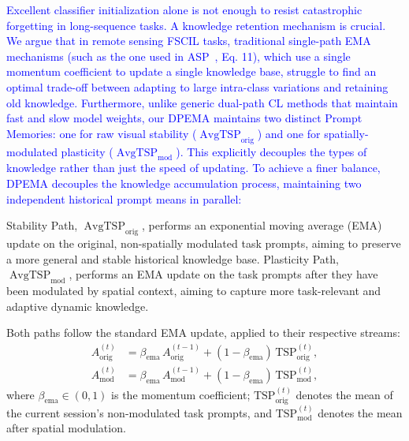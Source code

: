 ﻿\documentclass[letterpaper,journal]{IEEEtran}
\begin{document}
\textcolor{blue}{Excellent classifier initialization alone is not enough to resist catastrophic forgetting in long-sequence tasks. A knowledge retention mechanism is crucial. We argue that in remote sensing FSCIL tasks, traditional single-path EMA mechanisms (such as the one used in ASP~\cite{liu2024}, Eq. 11), which use a single momentum coefficient to update a single knowledge base, struggle to find an optimal trade-off between adapting to large intra-class variations and retaining old knowledge. Furthermore, unlike generic dual-path CL methods that maintain fast and slow model weights, our DPEMA maintains two distinct Prompt Memories: one for raw visual stability ($\operatorname{AvgTSP}_{\text{orig}}$) and one for spatially-modulated plasticity ($\operatorname{AvgTSP}_{\text{mod}}$). This explicitly decouples the types of knowledge rather than just the speed of updating. To achieve a finer balance, DPEMA decouples the knowledge accumulation process, maintaining two independent historical prompt means in parallel:}

Stability Path, $\operatorname{AvgTSP}_{\text{orig}}$, performs an exponential moving average (EMA) update on the original, non-spatially modulated task prompts, aiming to preserve a more general and stable historical knowledge base.
Plasticity Path, $\operatorname{AvgTSP}_{\text{mod}}$, performs an EMA update on the task prompts after they have been modulated by spatial context, aiming to capture more task-relevant and adaptive dynamic knowledge.

Both paths follow the standard EMA update, applied to their respective streams:
\begin{align}
\label{eq:ema_update}
A_{\text{orig}}^{(t)} &= \beta_{\text{ema}}\, A_{\text{orig}}^{(t-1)} + (1-\beta_{\text{ema}})\, \text{TSP}_{\text{orig}}^{(t)},\\
A_{\text{mod}}^{(t)}  &= \beta_{\text{ema}}\, A_{\text{mod}}^{(t-1)}  + (1-\beta_{\text{ema}})\, \text{TSP}_{\text{mod}}^{(t)},
\end{align} where $\beta_{\text{ema}}\in(0,1)$ is the momentum coefficient; $\text{TSP}_{\text{orig}}^{(t)}$ denotes the mean of the current session's non-modulated task prompts, and $\text{TSP}_{\text{mod}}^{(t)}$ denotes the mean after spatial modulation.
\end{document}
